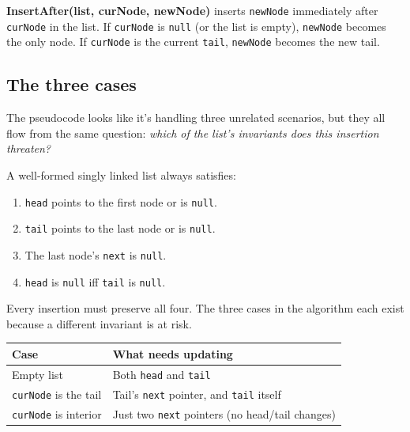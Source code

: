 \documentclass[11pt]{article}
\begin{document}
\begin{defnbox}
\textbf{InsertAfter(list, curNode, newNode)} inserts \texttt{newNode}
immediately after \texttt{curNode} in the list. If \texttt{curNode}
is \texttt{null} (or the list is empty), \texttt{newNode} becomes
the only node. If \texttt{curNode} is the current \texttt{tail},
\texttt{newNode} becomes the new tail.
\end{defnbox}

\subsection{The three cases}

The pseudocode looks like it's handling three unrelated scenarios,
but they all flow from the same question: \emph{which of the list's
invariants does this insertion threaten?}

\begin{ideabox}
A well-formed singly linked list always satisfies:
\begin{enumerate}[leftmargin=*]
  \item \texttt{head} points to the first node or is \texttt{null}.
  \item \texttt{tail} points to the last node or is \texttt{null}.
  \item The last node's \texttt{next} is \texttt{null}.
  \item \texttt{head} is \texttt{null} iff \texttt{tail} is \texttt{null}.
\end{enumerate}
Every insertion must preserve all four. The three cases in the
algorithm each exist because a different invariant is at risk.
\end{ideabox}

\begin{center}
\footnotesize
\renewcommand{\arraystretch}{1.3}
\begin{tabular}{@{}p{3.8cm}p{8.2cm}@{}}
\hline
\textbf{Case} & \textbf{What needs updating} \\
\hline
Empty list                    & Both \texttt{head} and \texttt{tail} \\
\texttt{curNode} is the tail  & Tail's \texttt{next} pointer, and \texttt{tail} itself \\
\texttt{curNode} is interior  & Just two \texttt{next} pointers (no head/tail changes) \\
\hline
\end{tabular}
\end{center}
\end{document}
